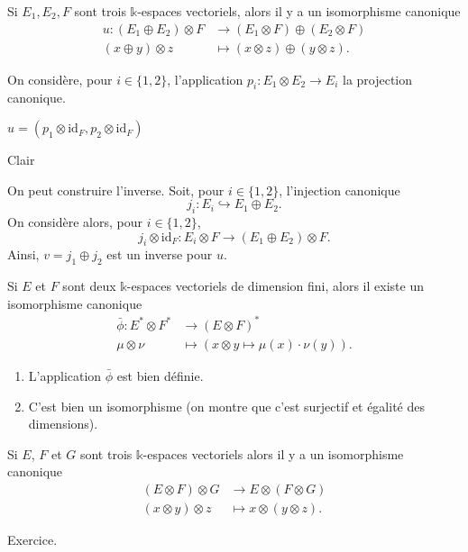 \documentclass{../../notes}
\begin{document}
  \begin{prop}
    Si $E_1, E_2, F$ sont trois $\mathds{k}$-espaces vectoriels, alors il y a un isomorphisme canonique
    \begin{align*}
      u: (E_1 \oplus E_2) \otimes F &\longrightarrow (E_1 \otimes F) \oplus (E_2 \otimes F) \\
      (x \oplus y) \otimes z &\longmapsto (x \otimes z) \oplus (y \otimes z)
    .\end{align*}
  \end{prop}
  \begin{prv}
    On considère, pour $i \in \{1,2\}$, l'application $p_i : E_1 \otimes E_2 \to E_i$ la projection canonique.

    \begin{obs}
      $u = (p_1 \otimes \mathrm{id}_F, p_2 \otimes \mathrm{id}_F)$
    \end{obs}
    \begin{expl}
      Clair
    \end{expl}

    On peut construire l'inverse. Soit, pour $i \in \{1,2\}$, l'injection canonique \[
    j_i : E_i \hookrightarrow E_1 \oplus E_2
    .\]
    On considère alors, pour $i \in \{1,2\}$, \[
    j_i \otimes \mathrm{id}_F : E_i \otimes F \to (E_1 \oplus E_2) \otimes F
    .\]
    Ainsi, $v = j_1 \oplus j_2$ est un inverse pour $u$.
  \end{prv}

  \begin{prop}
    Si $E$ et $F$ sont deux $\mathds{k}$-espaces vectoriels de dimension fini, alors il existe un isomorphisme canonique
    \begin{align*}
      \bar{\phi}: E^* \otimes F^* &\longrightarrow (E\otimes F)^* \\
    \mu \otimes \nu &\longmapsto (x \otimes y \mapsto \mu(x) \cdot \nu(y))
    .\end{align*}
  \end{prop}
  \begin{prv}
    \begin{enumerate}
      \item L'application $\bar{\phi}$ est bien définie.
      \item C'est bien un isomorphisme (on montre que c'est surjectif et égalité des dimensions).
    \end{enumerate}
  \end{prv}

  \begin{prop}
    Si $E$, $F$ et $G$ sont trois $\mathds{k}$-espaces vectoriels alors il y a un isomorphisme canonique
    \begin{align*}
      (E \otimes F) \otimes G  &\longrightarrow E \otimes (F \otimes G) \\
      (x \otimes y) \otimes z &\longmapsto x \otimes (y \otimes z)
    .\end{align*}
  \end{prop}
  \begin{prv}
    Exercice.
  \end{prv}
\end{document}
